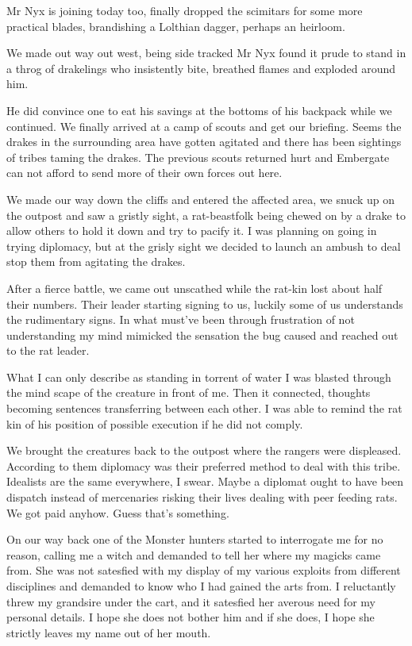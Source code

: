\documentclass{article}
\begin{document}
Mr Nyx is joining today too, finally dropped the scimitars for some more practical blades, brandishing a Lolthian dagger, perhaps an heirloom. 

We made out way out west, being side tracked Mr Nyx found it prude to stand in a throg of drakelings who insistently bite, breathed flames and exploded around him.

He did convince one to eat his savings at the bottoms of his backpack while we continued. We finally arrived at a camp of scouts and get our briefing. Seems the drakes in the surrounding area have gotten agitated and there has been sightings of tribes taming the drakes. The previous scouts returned hurt and Embergate can not afford to send more of their own forces out here.

We made our way down the cliffs and entered the affected area, we snuck up on the outpost and saw a gristly sight, a rat-beastfolk being chewed on by a drake to allow others to hold it down and try to pacify it. I was planning on going in trying diplomacy, but at the grisly sight we decided to launch an ambush to deal stop them from agitating the drakes.

After a fierce battle, we came out unscathed while the rat-kin lost about half their numbers. Their leader starting signing to us, luckily some of us understands the rudimentary signs. In what must've been through frustration of not understanding my mind mimicked the sensation the bug caused and reached out to the rat leader. 

What I can only describe as standing in torrent of water I was blasted through the mind scape of the creature in front of me. Then it connected, thoughts becoming sentences transferring between each other. I was able to remind the rat kin of his position of possible execution if he did not comply.

We brought the creatures back to the outpost where the rangers were displeased. According to them diplomacy was their preferred method to deal with this tribe. Idealists are the same everywhere, I swear. Maybe a diplomat ought to have been dispatch instead of mercenaries risking their lives dealing with peer feeding rats. We got paid anyhow. Guess that's something.

On our way back one of the Monster hunters started to interrogate me for no reason, calling me a witch and demanded to tell her where my magicks came from. She was not satesfied with my display of my various exploits from different disciplines and demanded to know who I had gained the arts from. I reluctantly threw my grandsire under the cart, and it satesfied her averous need for my personal details. I hope she does not bother him and if she does, I hope she strictly leaves my name out of her mouth.
\end{document}
